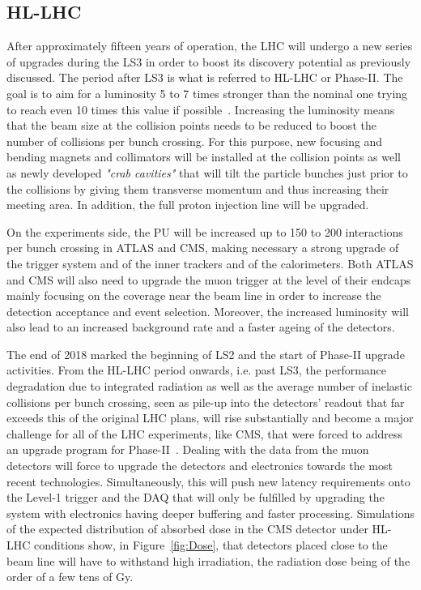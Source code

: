 	\subsection{\acl{HL-LHC}}
	\label{chapt2:ssec:HL-LHC}
		
	After approximately fifteen years of operation, the LHC will undergo a new series of upgrades during the LS3 in order to boost its discovery potential as previously discussed. The period after LS3 is what is referred to HL-LHC or Phase-II. The goal is to aim for a luminosity 5 to 7 times stronger than the nominal one trying to reach even 10 times this value if possible~\cite{HLLHC2017,HLLHCPDR}. Increasing the luminosity means that the beam size at the collision points needs to be reduced to boost the number of collisions per bunch crossing. For this purpose, new focusing and bending magnets and collimators will be installed at the collision points as well as newly developed \textit{"crab cavities"} that will tilt the particle bunches just prior to the collisions by giving them transverse momentum and thus increasing their meeting area. In addition, the full proton injection line will be upgraded.
	
	On the experiments side, the \acf{PU} will be increased up to 150 to 200 interactions per bunch crossing in ATLAS and CMS, making necessary a strong upgrade of the trigger system and of the inner trackers and of the calorimeters. Both ATLAS and CMS will also need to upgrade the muon trigger at the level of their endcaps mainly focusing on the coverage near the beam line in order to increase the detection acceptance and event selection. Moreover, the increased luminosity will also lead to an increased background rate and a faster ageing of the detectors.

	The end of 2018 marked the beginning of LS2 and the start of Phase-II upgrade activities. From the HL-LHC period onwards, i.e. past LS3, the performance degradation due to integrated radiation as well as the average number of inelastic collisions per bunch crossing, seen as pile-up into the detectors' readout that far exceeds this of the original LHC plans, will rise substantially and become a major challenge for all of the LHC experiments, like CMS, that were forced to address an upgrade program for Phase-II~\cite{PHASEIITP}. Dealing with the data from the muon detectors will force to upgrade the detectors and electronics towards the most recent technologies. Simultaneously, this will push new latency requirements onto the Level-1 trigger and the \acf{DAQ} that will only be fulfilled by upgrading the system with electronics having deeper buffering and faster processing. Simulations of the expected distribution of absorbed dose in the CMS detector under HL-LHC conditions show, in Figure~\ref{fig:Dose}, that detectors placed close to the beam line will have to withstand high irradiation, the radiation dose being of the order of a few tens of \si{Gy}.


